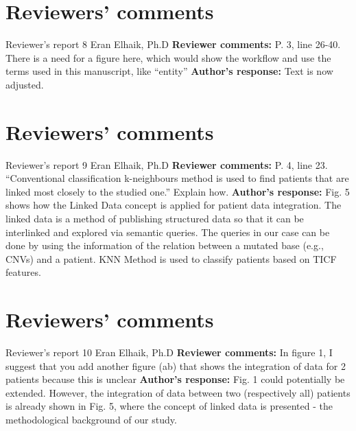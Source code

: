 \documentclass{bmcart}
\begin{document}
\begin{backmatter}
\section*{Reviewers' comments}
\newline Reviewer's report 8
\newline Eran Elhaik, Ph.D
\newline \textbf{Reviewer comments:}
P. 3, line 26-40. There is a need for a figure here, which would show the workflow and use the terms used in this manuscript, like “entity”
\newline \textbf{Author's response:}
Text is now adjusted.

\section*{Reviewers' comments}
\newline Reviewer's report 9
\newline Eran Elhaik, Ph.D
\newline \textbf{Reviewer comments:}
 P. 4, line 23. “Conventional classification k-neighbours method is used to find patients that are linked most closely to the studied one.” Explain how.
\newline \textbf{Author's response:}
Fig. 5 shows how the Linked Data concept is applied for patient data integration. The linked data is a method of publishing structured data so that it can be interlinked and explored via semantic queries. The queries in our case can be done by using the information of the relation between a mutated base (e.g., CNVs) and a patient.
KNN Method is used to classify patients based on TICF features.

\section*{Reviewers' comments}
\newline Reviewer's report 10
\newline Eran Elhaik, Ph.D
\newline \textbf{Reviewer comments:}
In figure 1, I suggest that you add another figure (ab) that shows the integration of data for 2 patients because this is unclear
\newline \textbf{Author's response:}
Fig. 1 could potentially be extended. However, the integration of data between two (respectively all) patients is already shown in Fig. 5, where the concept of linked data is presented - the methodological background of our study.


\end{backmatter}
\end{document}
